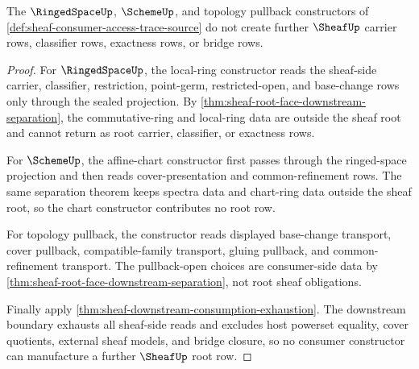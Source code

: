 \begin{theorem}
\label{thm:sheaf-consumer-access-trace-no-feedback}
The $\RingedSpaceUp$, $\SchemeUp$, and topology pullback constructors of \autoref{def:sheaf-consumer-access-trace-source} do not create further $\SheafUp$ carrier rows, classifier rows, exactness rows, or bridge rows.
\end{theorem}
\begin{proof}
For $\RingedSpaceUp$, the local-ring constructor reads the sheaf-side carrier, classifier, restriction, point-germ, restricted-open, and base-change rows only through the sealed projection. By \autoref{thm:sheaf-root-face-downstream-separation}, the commutative-ring and local-ring data are outside the sheaf root and cannot return as root carrier, classifier, or exactness rows.

For $\SchemeUp$, the affine-chart constructor first passes through the ringed-space projection and then reads cover-presentation and common-refinement rows. The same separation theorem keeps spectra data and chart-ring data outside the sheaf root, so the chart constructor contributes no root row.

For topology pullback, the constructor reads displayed base-change transport, cover pullback, compatible-family transport, gluing pullback, and common-refinement transport. The pullback-open choices are consumer-side data by \autoref{thm:sheaf-root-face-downstream-separation}, not root sheaf obligations.

Finally apply \autoref{thm:sheaf-downstream-consumption-exhaustion}. The downstream boundary exhausts all sheaf-side reads and excludes host powerset equality, cover quotients, external sheaf models, and bridge closure, so no consumer constructor can manufacture a further $\SheafUp$ root row.
\end{proof}

